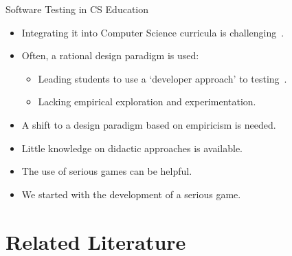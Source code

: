\documentclass[aspectratio=169]{beamer}
\begin{document}
\begin{frame}{Software Testing in CS Education}
\begin{itemize}
    \item Integrating it into Computer Science curricula is challenging~\cite{garousi2020software, scatalon2020teaching}.
    \item Often, a rational design paradigm is used:
    \begin{itemize}
        \item Leading students to use a `developer approach' to testing~\cite{doorn2023towards}.
        \item Lacking empirical exploration and experimentation.
    \end{itemize} 
    \item A shift to a design paradigm based on empiricism is needed.
    \item Little knowledge on didactic approaches is available.%
    \item The use of serious games can be helpful.
    \item We started with the development of a serious game.%
\end{itemize}
\end{frame}

\section{Related Literature}
\end{document}
